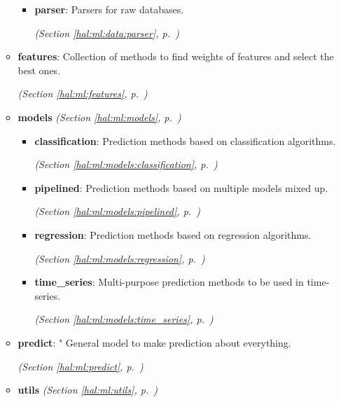 \begin{itemize}
\begin{itemize}
      \begin{itemize}
    \setlength{\parskip}{0ex}
        \item \textbf{parser}: Parsers for raw databases. 


  \textit{(Section \ref{hal:ml:data:parser}, p.~\pageref{hal:ml:data:parser})}

      \end{itemize}
    \item \textbf{features}: Collection of methods to find weights of features and select the best ones. 


  \textit{(Section \ref{hal:ml:features}, p.~\pageref{hal:ml:features})}

    \item \textbf{models}
  \textit{(Section \ref{hal:ml:models}, p.~\pageref{hal:ml:models})}

      \begin{itemize}
    \setlength{\parskip}{0ex}
        \item \textbf{classification}: Prediction methods based on classification algorithms. 


  \textit{(Section \ref{hal:ml:models:classification}, p.~\pageref{hal:ml:models:classification})}

        \item \textbf{pipelined}: Prediction methods based on multiple models mixed up. 


  \textit{(Section \ref{hal:ml:models:pipelined}, p.~\pageref{hal:ml:models:pipelined})}

        \item \textbf{regression}: Prediction methods based on regression algorithms. 


  \textit{(Section \ref{hal:ml:models:regression}, p.~\pageref{hal:ml:models:regression})}

        \item \textbf{time\_series}: Multi-purpose prediction methods to be used in time-series. 


  \textit{(Section \ref{hal:ml:models:time_series}, p.~\pageref{hal:ml:models:time_series})}

      \end{itemize}
    \item \textbf{predict}: " General model to make prediction about everything. 


  \textit{(Section \ref{hal:ml:predict}, p.~\pageref{hal:ml:predict})}

    \item \textbf{utils}
  \textit{(Section \ref{hal:ml:utils}, p.~\pageref{hal:ml:utils})}


\end{itemize}
\end{itemize}
